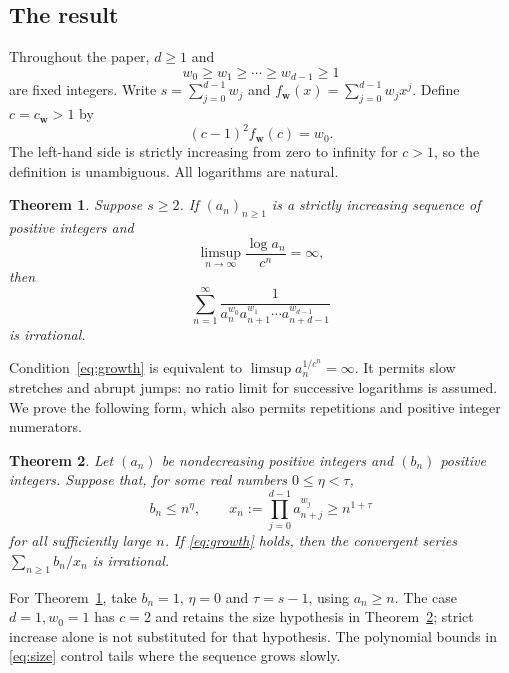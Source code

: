 \documentclass[11pt]{article}
\newtheorem{theorem}{Theorem}[section]
\numberwithin{equation}{section}
\newcommand{\bw}{\mathbf w}
\begin{document}
\subsection{The result}

Throughout the paper, $d\ge1$ and
\begin{equation}\label{eq:weights}
  w_0\ge w_1\ge\cdots\ge w_{d-1}\ge1
\end{equation}
are fixed integers. Write $s=\sum_{j=0}^{d-1}w_j$ and
$f_{\bw}(x)=\sum_{j=0}^{d-1}w_jx^j$. Define $c=c_{\bw}>1$ by
\begin{equation}\label{eq:root}
  (c-1)^2 f_{\bw}(c)=w_0.
\end{equation}
The left-hand side is strictly increasing from zero to infinity for
$c>1$, so the definition is unambiguous. All logarithms are natural.

\begin{theorem}\label{thm:strict}
Suppose $s\ge2$. If $(a_n)_{n\ge1}$ is a strictly increasing sequence
of positive integers and
\begin{equation}\label{eq:growth}
  \limsup_{n\to\infty}\frac{\log a_n}{c^n}=\infty,
\end{equation}
then
\begin{equation}\label{eq:unitseries}
  \sum_{n=1}^{\infty}
  \frac{1}{a_n^{w_0}a_{n+1}^{w_1}\cdots a_{n+d-1}^{w_{d-1}}}
\end{equation}
is irrational.
\end{theorem}

Condition~\eqref{eq:growth} is equivalent to
$\limsup a_n^{1/c^n}=\infty$. It permits slow stretches and abrupt
jumps: no ratio limit for successive logarithms is assumed.
We prove the following form, which also permits repetitions and
positive integer numerators.

\begin{theorem}\label{thm:general}
Let $(a_n)$ be nondecreasing positive integers and $(b_n)$ positive
integers. Suppose that, for some real numbers $0\le\eta<\tau$,
\begin{equation}\label{eq:size}
  b_n\le n^\eta,\qquad
  x_n:=\prod_{j=0}^{d-1}a_{n+j}^{w_j}\ge n^{1+\tau}
\end{equation}
for all sufficiently large $n$. If \eqref{eq:growth} holds, then the
convergent series $\sum_{n\ge1}b_n/x_n$ is irrational.
\end{theorem}

For Theorem~\ref{thm:strict}, take $b_n=1$, $\eta=0$ and $\tau=s-1$,
using $a_n\ge n$. The case $d=1,w_0=1$ has $c=2$ and retains the
size hypothesis in Theorem~\ref{thm:general}; strict increase alone is
not substituted for that hypothesis. The polynomial bounds in
\eqref{eq:size} control tails where the sequence grows slowly.
\end{document}
